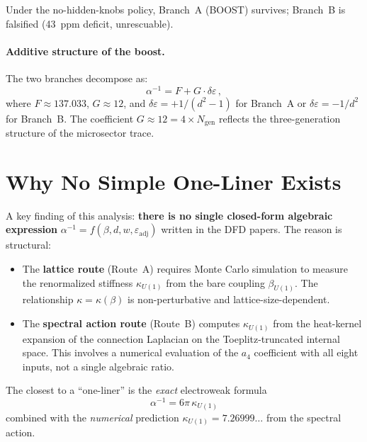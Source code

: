 \documentclass[12pt,a4paper]{article}
\begin{document}
Under the no-hidden-knobs policy, Branch~A (BOOST) survives; Branch~B
is falsified (43~ppm deficit, unrescuable).

\paragraph{Additive structure of the boost.}
The two branches decompose as:
\begin{equation}
\alpha^{-1} = F + G \cdot \delta\varepsilon\,,
\end{equation}
where $F \approx 137.033$, $G \approx 12$, and
$\delta\varepsilon = +1/(d^2{-}1)$ for Branch~A or
$\delta\varepsilon = -1/d^2$ for Branch~B.
The coefficient $G \approx 12 = 4 \times N_{\mathrm{gen}}$ reflects the
three-generation structure of the microsector trace.

\section{Why No Simple One-Liner Exists}
\label{sec:no-oneliner}

A key finding of this analysis: \textbf{there is no single closed-form
algebraic expression} $\alpha^{-1} = f(\beta, d, w, \varepsilon_{\mathrm{adj}})$
written in the DFD papers.  The reason is structural:

\begin{itemize}
\item The \textbf{lattice route} (Route~A) requires Monte Carlo simulation to
  measure the renormalized stiffness $\kappa_{U(1)}$ from the bare coupling
  $\beta_{U(1)}$.  The relationship $\kappa = \kappa(\beta)$ is non-perturbative
  and lattice-size-dependent.

\item The \textbf{spectral action route} (Route~B) computes $\kappa_{U(1)}$
  from the heat-kernel expansion of the connection Laplacian on the
  Toeplitz-truncated internal space.  This involves a numerical evaluation
  of the $a_4$ coefficient with all eight inputs, not a single algebraic
  ratio.
\end{itemize}

The closest to a ``one-liner'' is the \emph{exact} electroweak formula
\begin{equation}
\boxed{\alpha^{-1} = 6\pi\,\kappa_{U(1)}}
\end{equation}
combined with the \emph{numerical} prediction $\kappa_{U(1)} = 7.26999\ldots$
from the spectral action.
\end{document}
